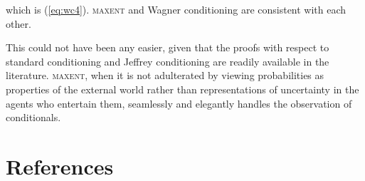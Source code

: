 \documentclass[11pt]{article}
\begin{document}
which is (\ref{eq:wc4}). \textsc{maxent} and Wagner conditioning are
consistent with each other.

This could not have been any easier, given that the proofs with
respect to standard conditioning and Jeffrey conditioning are readily
available in the literature. \textsc{maxent}, when it is not
adulterated by viewing probabilities as properties of the external
world rather than representations of uncertainty in the agents who
entertain them, seamlessly and elegantly handles the observation of
conditionals.

\section{References}
\label{References}

% 


\end{document}
